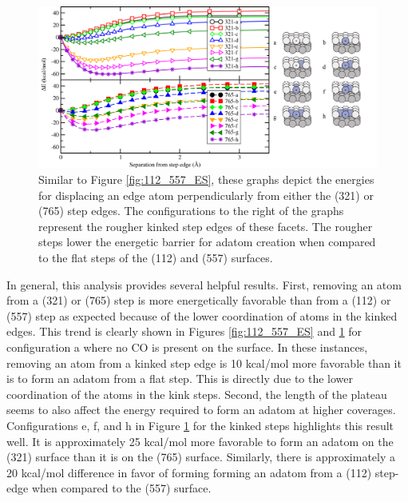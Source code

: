 \begin{landscape}
\begin{figure}[p!]
  \centering
  \includegraphics[width=0.9\linewidth]{../figures/chap4/321_765_EnergySeparation.pdf}
  \caption{Similar to Figure \ref{fig:112_557_ES}, these graphs depict the
energies for displacing an edge atom perpendicularly from either the (321) or
(765) step edges. The configurations to the right of the graphs represent the
rougher kinked step edges of these facets. The rougher steps lower the 
energetic barrier for adatom creation when compared to the flat steps of the
(112) and (557) surfaces.}
\label{fig:321_765_ES}
\end{figure}
\end{landscape}

In general, this analysis provides several helpful results. First, removing an
atom from a (321) or (765) step is more energetically favorable than from a
(112) or (557) step as expected because of the lower coordination of atoms in
the kinked edges. This trend is clearly shown in Figures \ref{fig:112_557_ES}
and \ref{fig:321_765_ES} for configuration a where no CO is present on the
surface. In these instances, removing an atom from a kinked step edge is 10
kcal/mol more favorable than it is to form an adatom from a flat step. This is
directly due to the lower coordination of the atoms in the kink steps.
Second, the length of the plateau seems to also affect the energy required to form
an adatom at higher coverages.  Configurations e, f, and h in Figure
\ref{fig:321_765_ES} for the kinked steps highlights this result well. It is
approximately 25 kcal/mol more favorable to form an adatom on the (321) surface
than it is on the (765) surface. Similarly, there is approximately a 20
kcal/mol difference in favor of forming  forming an adatom from a (112) step-edge when
compared to the (557) surface.

